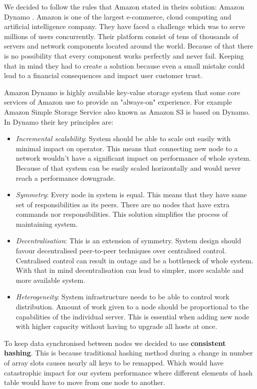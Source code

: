   We decided to follow the rules that Amazon stated in theirs solution: Amazon Dynamo \cite{AmazonDynamo}.
  Amazon is one of the largest e-commerce, cloud computing and artificial intelligence company.
  They have faced a challenge which was to serve millions of users concurrently.
  Their platform consist of tens of thousands of servers and network components located around the world.
  Because of that there is no possibility that every component works perfectly and never fail.
  Keeping that in mind they had to create a solution because even a small mistake could lead to a financial consequences and impact user customer trust.

  Amazon Dynamo is highly available key-value storage system that some core services of Amazon use to provide an "always-on" experience.
  For example Amazon Simple Storage Service also known as Amazon S3 is based on Dynamo.
  In Dynamo their key principles are:

\begin{itemize}
  \item \textit{Incremental scalability}:
    System should be able to scale out easily with minimal impact on operator. This means that connecting new node to a network
    wouldn't have a significant impact on performance of whole system. Because of that system can be easily scaled horizontally
    and would never reach a performance downgrade.
  \item \textit{Symmetry}:
    Every node in system is equal. This means that they have same set of responsibilities as its peers. There are no nodes that
    have extra commands nor responsibilities. This solution simplifies the process of maintaining system.
  \item \textit{Decentralisation}:
    This is an extension of symmetry. System design should favour decentralised peer-to-peer techniques over centralised control.
    Centralised control can result in outage and be a bottleneck of whole system. With that in mind decentralisation can lead to
    simpler, more scalable and more available system.
  \item \textit{Heterogeneity}:
    System infrastructure needs to be able to control work distribution. Amount of work given to a node should be proportional
    to the capabilities of the individual server. This is essential when adding new node with higher capacity without having to
    upgrade all hosts at once.
\end{itemize}

  To keep data synchronised between nodes we decided to use \textbf{consistent hashing}. This is because traditional hashing method
  during a change in number of array slots causes nearly all keys to be remapped. Which would have catastrophic impact for
  our system performance where different elements of hash table would have to move from one node to another.

